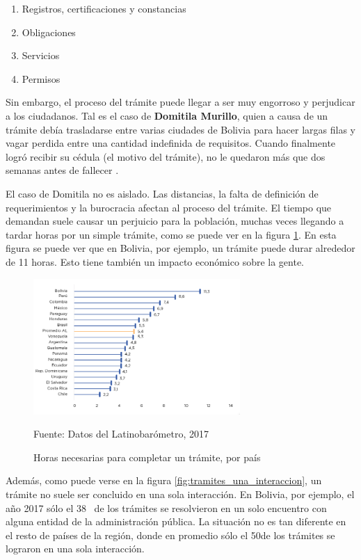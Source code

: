 \begin{enumerate}
    \item Registros, certificaciones y constancias
    \item Obligaciones
    \item Servicios
    \item Permisos
\end{enumerate}

Sin embargo, el proceso del trámite puede llegar a ser muy engorroso y perjudicar a los ciudadanos.
Tal es el caso de \textbf{Domitila Murillo}, quien a causa de un trámite debía trasladarse entre varias ciudades de Bolivia para hacer largas filas y vagar perdida entre una cantidad indefinida de requisitos. 
Cuando finalmente logró recibir su cédula (el motivo del trámite), no le quedaron más que dos semanas antes de fallecer \cite{charoskyQuejaComoEnergia2014}.

El caso de Domitila no es aislado. 
Las distancias, la falta de definición de requerimientos y la burocracia afectan al proceso del trámite. 
El tiempo que demandan suele causar un perjuicio para la población, muchas veces llegando a tardar horas por un simple trámite, como se puede ver en la figura \ref{fig:horastramite}.
En esta figura se puede ver que en Bolivia, por ejemplo, un trámite puede durar alrededor de 11 horas. Esto tiene también un impacto económico sobre la gente. 

\begin{figure}[htbp]
    \centering
    \includegraphics[width=0.7\textwidth]{assets/horastramite}
    \caption{Horas necesarias para completar un trámite, por país}{Fuente: Datos del Latinobarómetro, 2017}
    \label{fig:horastramite}
\end{figure}

Además, como puede verse en la figura \ref{fig:tramites_una_interaccion}, un trámite no suele ser concluido en una sola interacción. 
En Bolivia, por ejemplo, el año 2017 sólo el 38\percentsign ~ de los trámites se resolvieron en un solo encuentro con alguna entidad de la administración pública. 
La situación no es tan diferente en el resto de países de la región, donde en promedio sólo el 50\percentsign de los trámites se lograron en una sola interacción.

